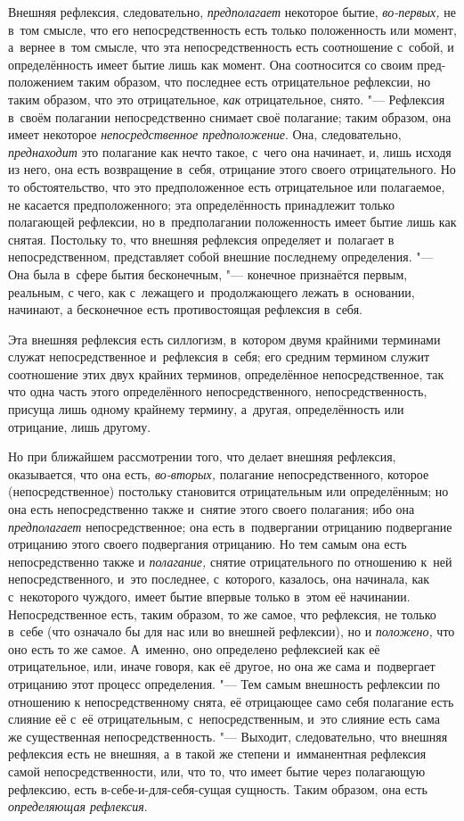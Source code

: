 Внешняя рефлексия, следовательно, {\em предполагает}
некоторое бытие, {\em во-первых,} не в~том смысле, что
его непосредственность есть только положенность или момент, а~вернее в~том
смысле, что эта непосредственность есть соотношение с~собой, и
определённость имеет бытие лишь как момент. Она соотносится со своим
пред-положением таким образом, что последнее есть отрицательное рефлексии,
но таким образом, что это отрицательное, {\em как}
отрицательное, снято. "--- Рефлексия в~своём полагании непосредственно снимает
своё полагание; таким образом, она имеет некоторое
{\em непосредственное предположение}. Она,
следовательно, {\em преднаходит} это полагание как
нечто такое, с~чего она начинает, и, лишь исходя из него, она есть
возвращение в~себя, отрицание этого своего отрицательного. Но то
обстоятельство, что это предположенное есть отрицательное или полагаемое,
не касается предположенного; эта определённость принадлежит только
полагающей рефлексии, но в~предполагании положенность имеет бытие лишь как
снятая. Постольку то, что внешняя рефлексия определяет и~полагает в
непосредственном, представляет собой внешние последнему определения. "--- Она
была в~сфере бытия бесконечным, "--- конечное признаётся первым, реальным, с
чего, как с~лежащего и~продолжающего лежать в~основании, начинают, а
бесконечное есть противостоящая рефлексия в~себя.

Эта внешняя рефлексия есть силлогизм, в~котором двумя крайними терминами
служат непосредственное и~рефлексия в~себя; его средним термином служит
соотношение этих двух крайних терминов, определённое непосредственное, так
что одна часть этого определённого непосредственного, непосредственность,
присуща лишь одному крайнему термину, а~другая, определённость или
отрицание, лишь другому.

Но при ближайшем рассмотрении того, что делает внешняя рефлексия,
оказывается, что она есть, {\em во-вторых,} полагание
непосредственного, которое (непосредственное) постольку становится
отрицательным или определённым; но она есть непосредственно также и~снятие
этого своего полагания; ибо она {\em предполагает}
непосредственное; она есть в~подвергании отрицанию подвергание отрицанию
этого своего подвергания отрицанию. Но тем самым она есть непосредственно
также и {\em полагание,} снятие отрицательного по
отношению к~ней непосредственного, и~это последнее, с~которого, казалось,
она начинала, как с~некоторого чуждого, имеет бытие впервые только в~этом
её начинании. Непосредственное есть, таким образом, то же самое, что
рефлексия, не только в~себе (что означало бы для нас или во внешней
рефлексии), но и {\em положено,} что оно есть то же
самое. А~именно, оно определено рефлексией как её отрицательное, или, иначе
говоря, как её другое, но она же сама и~подвергает отрицанию этот процесс
определения. "--- Тем самым внешность рефлексии по отношению к
непосредственному снята, её отрицающее само себя полагание есть слияние её
с~её отрицательным, с~непосредственным, и~это слияние есть сама же
существенная непосредственность. "--- Выходит, следовательно, что внешняя
рефлексия есть не внешняя, а~в такой же степени и~имманентная рефлексия
самой непосредственности, или, что то, что имеет бытие через полагающую
рефлексию, есть в-себе-и-для-себя-сущая сущность. Таким образом, она есть
{\em определяющая рефлексия}.

